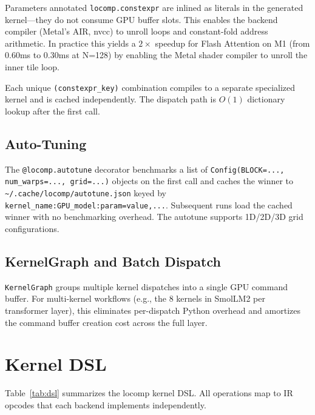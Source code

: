 \documentclass[10pt,twocolumn]{article}
\begin{document}
Parameters annotated \texttt{locomp.constexpr} are inlined as literals in the
generated kernel---they do not consume GPU buffer slots. This enables the
backend compiler (Metal's AIR, nvcc) to unroll loops and constant-fold
address arithmetic. In practice this yields a $2\times$ speedup for Flash
Attention on M1 (from 0.60ms to 0.30ms at N=128) by enabling the Metal
shader compiler to unroll the inner tile loop.

Each unique \texttt{(constexpr\_key)} combination compiles to a separate
specialized kernel and is cached independently. The dispatch path is
$O(1)$ dictionary lookup after the first call.

\subsection{Auto-Tuning}

The \texttt{@locomp.autotune} decorator benchmarks a list of
\texttt{Config(BLOCK=..., num\_warps=..., grid=...)} objects on the first
call and caches the winner to \texttt{\textasciitilde/.cache/locomp/autotune.json}
keyed by \texttt{kernel\_name:GPU\_model:param=value,...}. Subsequent runs
load the cached winner with no benchmarking overhead. The autotune supports
1D/2D/3D grid configurations.

\subsection{KernelGraph and Batch Dispatch}

\texttt{KernelGraph} groups multiple kernel dispatches into a single GPU command
buffer. For multi-kernel workflows (e.g., the 8 kernels in SmolLM2 per
transformer layer), this eliminates per-dispatch Python overhead and amortizes
the command buffer creation cost across the full layer.

\section{Kernel DSL}
\label{sec:dsl}

Table~\ref{tab:dsl} summarizes the locomp kernel DSL. All operations map to
IR opcodes that each backend implements independently.
\end{document}
